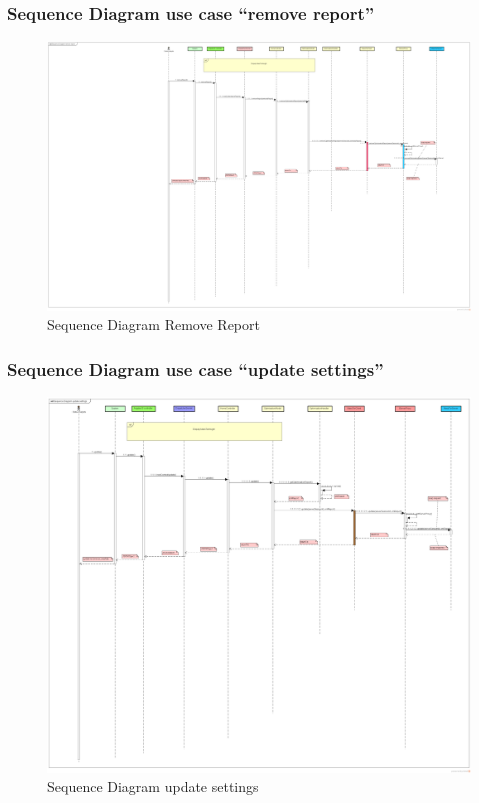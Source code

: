 	\subsubsection{Sequence Diagram use case ``remove report''}
	\begin{figure}[h]
		\centering
		\includegraphics[width=1\textwidth]{SequenceDiagramRemoveReport.png}
		\caption{Sequence Diagram Remove Report}
	\end{figure}
	\clearpage
	\newpage
	
	\subsubsection{Sequence Diagram use case ``update settings''}
	\begin{figure}[h]
		\centering
		\includegraphics[width=1\textwidth]{SequenceDiagramUpdateSettings.png}
		\caption{Sequence Diagram update settings}
	\end{figure}
	\clearpage
	\newpage
